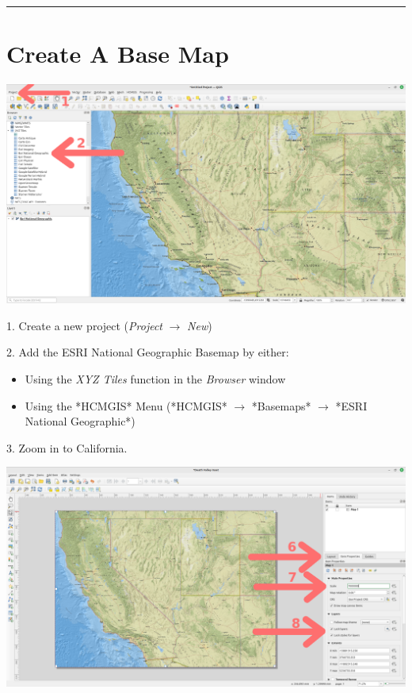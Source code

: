 \documentclass[oneside,a4paper,11pt,explicit]{book}
\begin{document}
\vspace{1 em}

\hrule

\clearpage

\vspace*{.25 em}

\section{Create A Base Map}

{\centering
	
	\includegraphics[width=\textwidth]{Basemap.png}}

1. Create a new project (\textit{Project} $\rightarrow$ \textit{New})

2. Add the ESRI National Geographic Basemap by either:
\begin{itemize}
	\item Using the \textit{XYZ Tiles} function in the \textit{Browser} window
	\item Using the *HCMGIS* Menu (*HCMGIS* $\rightarrow$ *Basemaps* $\rightarrow$ *ESRI National Geographic*)
\end{itemize}

3. Zoom in to California.

\vspace{.25em}

{\centering
	
	\includegraphics[width=\textwidth]{InsetItem.png}}
\end{document}

